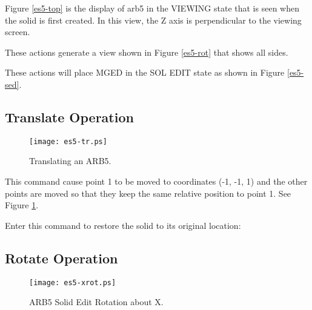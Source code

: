 Figure \ref{es5-top} is the display of arb5
in the VIEWING state that is seen when
the solid is first created.
In this view, the Z axis is perpendicular to the viewing screen.


These actions generate a view shown in Figure \ref{es5-rot}
that shows all sides.


These actions will place MGED in the SOL EDIT state
as shown in Figure \ref{es5-sed}.

\subsection{Translate Operation}

\begin{figure}
\centering \texttt{[image: es5-tr.ps]}
\caption{Translating an ARB5.}
\label{es5-tr}
\end{figure}


This command cause point 1 to be moved to coordinates (-1, -1, 1) and the
other points are moved so that they keep the same relative position to point
1.  See Figure \ref{es5-tr}.

Enter this command to restore the solid to its original location:


\subsection{Rotate Operation}

\begin{figure}
\centering \texttt{[image: es5-xrot.ps]}
\caption{ARB5 Solid Edit Rotation about X.}
\label{es5-xrot}
\end{figure}

